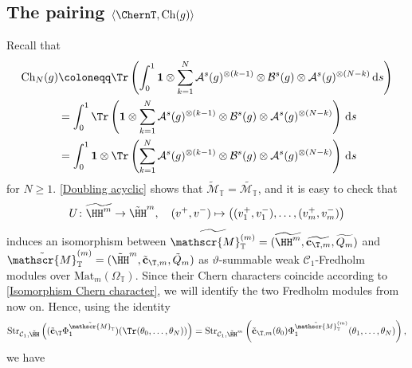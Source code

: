 \documentclass[a4paper, english, 12pt, bibliography=totocnumbered,
index=totoc]{scrartcl}
\begin{document}
\subsection{The pairing \texorpdfstring{$\langle \ChernT,
		\mathrm{Ch}(g) \rangle$}{<ChMT, Ch(g)>}}\label{Section: spectral flow
	pairing 1}
Recall that
\begin{align*}
	\mathrm{Ch}_N(g) & \coloneqq \Tr \left(\int_0^1 \mathbf{1} \otimes
	\sum_{k=1}^{N} \mathcal{A}^s(g)^{\otimes(k-1)} \otimes
	\mathcal{B}^s(g)
	\otimes \mathcal{A}^s(g)^{\otimes(N-k)} \, \mathrm{d}s\right)\\
	& = \int_0^1 \Tr \left(\mathbf{1} \otimes
	\sum_{k=1}^{N} \mathcal{A}^s(g)^{\otimes(k-1)} \otimes
	\mathcal{B}^s(g)
	\otimes \mathcal{A}^s(g)^{\otimes(N-k)}\right)\, \mathrm{d}s \\
	& = \int_0^1 \mathbf{1} \otimes \Tr \left(
	\sum_{k=1}^{N} \mathcal{A}^s(g)^{\otimes(k-1)} \otimes
	\mathcal{B}^s(g)
	\otimes \mathcal{A}^s(g)^{\otimes(N-k)}\right) \, \mathrm{d}s
\end{align*}
for $N \geq 1$.
\cref{Doubling acyclic} shows that
$\tilde{\mathscr{M}}_{\mathbb{T}} = \widetilde{\mathscr{M}_{\mathbb{T}}}$,
and it is easy to check that
\begin{equation*}
	U \colon \widetilde{\HH^m} \to \tilde{\HH}^m, \quad (v^{+}, v^{-})
	\mapsto \big((v^{+}_1, v^{-}_{1}), \ldots, (v^{+}_m, v^{-}_m)\big)
\end{equation*}
induces an isomorphism between $\widetilde{\mathscr{M}^{(m)}_{\mathbb{T}}} =
(\widetilde{\HH^m}, \widetilde{\mathbf{c}_{\T, m}}, \widetilde{Q_m})$ and
$\tilde{\mathscr{M}}_{\mathbb{T}}^{(m)} = (\tilde{\HH}^m,
\tilde{\mathbf{c}}_{\T, m}, \tilde{Q}_m)$ as $\vartheta$-summable weak
$\mathcal{C}_1$-Fredholm modules over $\mathrm{Mat}_m(\Omega_{\mathbb{T}})$.
Since their Chern characters
coincide according to \cref{Isomorphism Chern character}, we will identify
the two Fredholm modules from now on.
Hence, using the identity
\begin{equation}\label{Str clif1 tr}
	\mathrm{Str}_{\mathcal{C}_1, \tilde{\HH}}\left((\tilde{\mathbf{c}}_\T
	\Phi_1^{\tilde{\mathscr{M}}_{\mathbb{T}}})(\Tr(\theta_0, \ldots,
	\theta_N))\right) = \mathrm{Str}_{\mathcal{C}_1,
		\tilde{\HH}^m}\left(\tilde{\mathbf{c}}_{\T, m}(\theta_0)
	\Phi_1^{\tilde{\mathscr{M}}_{\mathbb{T}}^{(m)}}(\theta_1, \ldots,
	\theta_N)\right),
\end{equation}
we have
\end{document}

